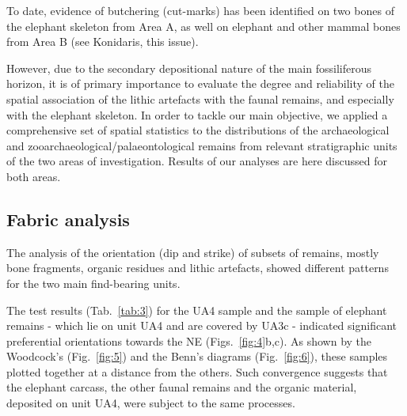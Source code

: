 \documentclass[review,authoryear,times]{elsarticle} %
\begin{document}
To date, evidence of butchering (cut-marks) has been identified on two bones of the elephant skeleton from Area A, as well on elephant and other mammal bones from Area B (see Konidaris, this issue).

However, due to the secondary depositional nature of the main fossiliferous horizon, it is of primary importance to evaluate the degree and reliability of the spatial association of the lithic artefacts with the faunal remains, and especially with the elephant skeleton. In order to tackle our main objective, we applied a comprehensive set of spatial statistics to the distributions of the archaeological and zooarchaeological/palaeontological remains from relevant stratigraphic units of the two areas of investigation. Results of our analyses are here discussed for both areas.

\subsection{Fabric analysis}



The analysis of the orientation (dip and strike) of subsets of remains, mostly bone fragments, organic residues and lithic artefacts, showed different patterns for the two main find-bearing units.


The test results (Tab.~\ref{tab:3}) for the UA4 sample and the sample of elephant remains - which lie on unit UA4 and are covered by UA3c - indicated significant preferential orientations towards the NE (Figs.~\ref{fig:4}b,c). As shown by the Woodcock's (Fig.~\ref{fig:5}) and the Benn's diagrams (Fig.~\ref{fig:6}), these samples plotted together at a distance from the others. Such convergence suggests that the elephant carcass, the other faunal remains and the organic material, deposited on unit UA4, were subject to the same processes.
\end{document}
